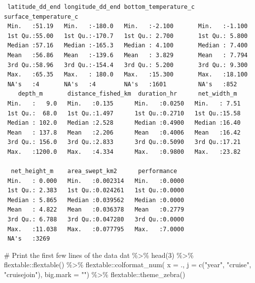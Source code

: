 \documentclass[
  letterpaper,
  oneside,
  open=any]{scrbook}
\newenvironment{Shaded}{\begin{snugshade}}{\end{snugshade}}
\newcommand{\AttributeTok}[1]{\textcolor[rgb]{0.40,0.45,0.13}{#1}}
\newcommand{\CommentTok}[1]{\textcolor[rgb]{0.37,0.37,0.37}{#1}}
\newcommand{\DecValTok}[1]{\textcolor[rgb]{0.68,0.00,0.00}{#1}}
\newcommand{\FunctionTok}[1]{\textcolor[rgb]{0.28,0.35,0.67}{#1}}
\newcommand{\NormalTok}[1]{\textcolor[rgb]{0.00,0.23,0.31}{#1}}
\newcommand{\SpecialCharTok}[1]{\textcolor[rgb]{0.37,0.37,0.37}{#1}}
\newcommand{\StringTok}[1]{\textcolor[rgb]{0.13,0.47,0.30}{#1}}
\begin{document}
\begin{verbatim}
 latitude_dd_end longitude_dd_end bottom_temperature_c surface_temperature_c
 Min.   :51.19   Min.   :-180.0   Min.   :-2.100       Min.   :-1.100       
 1st Qu.:55.00   1st Qu.:-170.7   1st Qu.: 2.700       1st Qu.: 5.800       
 Median :57.16   Median :-165.3   Median : 4.100       Median : 7.400       
 Mean   :56.86   Mean   :-139.6   Mean   : 3.829       Mean   : 7.794       
 3rd Qu.:58.96   3rd Qu.:-154.4   3rd Qu.: 5.200       3rd Qu.: 9.300       
 Max.   :65.35   Max.   : 180.0   Max.   :15.300       Max.   :18.100       
 NA's   :4       NA's   :4        NA's   :1601         NA's   :852          
    depth_m       distance_fished_km  duration_hr      net_width_m   
 Min.   :   9.0   Min.   :0.135      Min.   :0.0250   Min.   : 7.51  
 1st Qu.:  68.0   1st Qu.:1.497      1st Qu.:0.2710   1st Qu.:15.58  
 Median : 102.0   Median :2.528      Median :0.4900   Median :16.40  
 Mean   : 137.8   Mean   :2.206      Mean   :0.4006   Mean   :16.42  
 3rd Qu.: 156.0   3rd Qu.:2.833      3rd Qu.:0.5090   3rd Qu.:17.21  
 Max.   :1200.0   Max.   :4.334      Max.   :0.9800   Max.   :23.82  
                                                                     
  net_height_m    area_swept_km2      performance    
 Min.   : 0.000   Min.   :0.002314   Min.   :0.0000  
 1st Qu.: 2.383   1st Qu.:0.024261   1st Qu.:0.0000  
 Median : 5.865   Median :0.039562   Median :0.0000  
 Mean   : 4.822   Mean   :0.036378   Mean   :0.2779  
 3rd Qu.: 6.788   3rd Qu.:0.047280   3rd Qu.:0.0000  
 Max.   :11.038   Max.   :0.077795   Max.   :7.0000  
 NA's   :3269                                        
\end{verbatim}

\begin{Shaded}
\begin{Highlighting}[]
\CommentTok{\# Print the first few lines of the data }
\NormalTok{dat }\SpecialCharTok{\%\textgreater{}\%} 
  \FunctionTok{head}\NormalTok{(}\DecValTok{3}\NormalTok{) }\SpecialCharTok{\%\textgreater{}\%} 
\NormalTok{  flextable}\SpecialCharTok{::}\FunctionTok{flextable}\NormalTok{() }\SpecialCharTok{\%\textgreater{}\%}
\NormalTok{  flextable}\SpecialCharTok{::}\FunctionTok{colformat\_num}\NormalTok{(}
      \AttributeTok{x =}\NormalTok{ ., }
      \AttributeTok{j =} \FunctionTok{c}\NormalTok{(}\StringTok{"year"}\NormalTok{, }\StringTok{"cruise"}\NormalTok{, }\StringTok{"cruisejoin"}\NormalTok{), }
      \AttributeTok{big.mark =} \StringTok{""}\NormalTok{) }\SpecialCharTok{\%\textgreater{}\%} 
\NormalTok{  flextable}\SpecialCharTok{::}\FunctionTok{theme\_zebra}\NormalTok{()}
\end{Highlighting}
\end{Shaded}
\end{document}
